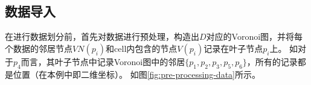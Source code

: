 \documentclass{ML}
\def\n{2} %
\def\maxxy{6} %
\begin{document}
\subsection{数据导入}
在进行数据划分前，首先对数据进行预处理，构造出$D$对应的Voronoi图，并将每个数据的邻居节点$VN(p_i)$和cell内包含的节点$V(p_i)$记录在叶子节点$p_i$上。
如对于$p_4$而言，其叶子节点中记录Voronoi图中的邻居$\{p_1, p_2, p_3, p_5, p_6\}$，所有的记录都是位置（在本例中即二维坐标）。
如图\ref{fig:pre-processing-data}所示。
\begin{figure}[H]
  \centering
\end{figure}
\end{document}
